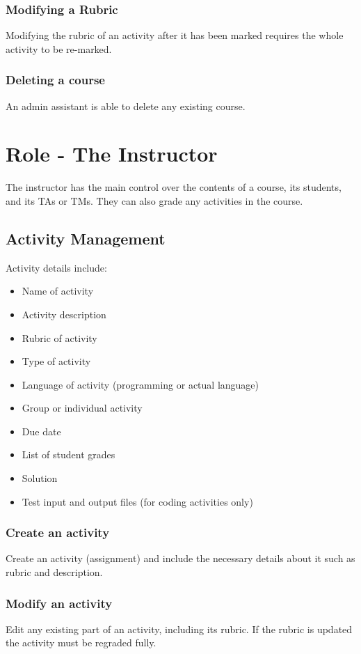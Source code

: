 \documentclass{article}
\begin{document}
\subsubsection{Modifying a Rubric}
Modifying the rubric of an activity after it has been marked requires the whole
activity to be re-marked.
\subsubsection{Deleting a course}
An admin assistant is able to delete any existing course.

\section{Role - The Instructor \label{Instructor}}
The instructor has the main control over the contents of a course, its students, 
and its TAs or TMs. They can also grade any activities in the course.
\subsection{Activity Management \label{ActivityManagement}}
Activity details include:
\begin {itemize}
	\item Name of activity
	\item Activity description
	\item Rubric of activity
	\item Type of activity
	\item Language of activity (programming or actual language)
	\item Group or individual activity
	\item Due date
	\item List of student grades
	\item Solution
	\item Test input and output files (for coding activities only)
\end {itemize}
\subsubsection{Create an activity \label{CreateAct}}
Create an activity (assignment) and include the necessary details about it such 
as rubric and description.
\subsubsection{Modify an activity \label{ModifyAct}}
Edit any existing part of an activity, including its rubric. If the rubric is updated
the activity must be regraded fully.
\end{document}
